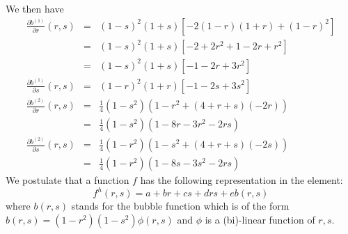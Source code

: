 We then have
\begin{eqnarray}
\frac{\partial b^{(1)}}{\partial r}(r,s) 
&=& (1-s)^2(1+s)[-2(1-r)(1+r)+(1-r)^2]\\
&=& (1-s)^2(1+s)[-2+2r^2 + 1-2r+r^2]\\
&=& (1-s)^2(1+s)[-1-2r+3r^2]\\
\frac{\partial b^{(1)}}{\partial s}(r,s) 
&=& (1-r)^2(1+r)[-1-2s+3s^2 ] \\
\frac{\partial b^{(2)}}{\partial r}(r,s) 
&=& \frac{1}{4} (1-s^2) (1-r^2 + (4+r+s) (-2r)) \\
&=& \frac{1}{4} (1-s^2) (1-8r-3r^2 -2rs) \\
\frac{\partial b^{(2)}}{\partial s}(r,s) 
&=& \frac{1}{4} (1-r^2) (1-s^2 + (4+r+s) (-2s)) \\
&=& \frac{1}{4} (1-r^2) (1-8s-3s^2 -2rs) 
\end{eqnarray}
We postulate that a function $f$ has the following representation 
in the element:
\[
f^h(r,s)=a+br+cs+drs+e b(r,s) 
\]
where $b(r,s)$ stands for the bubble function which is of the form $b(r,s)=(1-r^2)(1-s^2)\phi(r,s)$
and $\phi$ is a (bi)-linear function of $r,s$.

